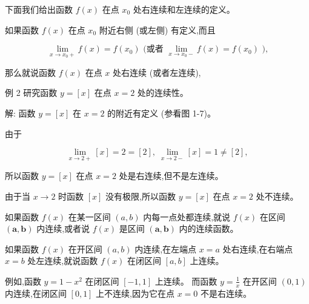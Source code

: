 \documentclass[lang=cn,newtx,12pt,scheme=chinese]{elegantbook}
\begin{document}
\begin{definition}[单侧连续性] 

下面我们给出函数 \(f\left( x\right)\) 在点 \({x}_{0}\) 处右连续和左连续的定义。

如果函数 \(f\left( x\right)\) 在点 \({x}_{0}\) 附近右侧 (或左侧) 有定义,而且

\[
\mathop{\lim }\limits_{{x \rightarrow {x}_{0} + }}f\left( x\right) = f\left( {x}_{0}\right) \text{ (或者 }\mathop{\lim }\limits_{{x \rightarrow {x}_{0} - }}f\left( x\right) = f\left( {x}_{0}\right) \text{ ),}
\]

那么就说函数 \(f\left( x\right)\) 在点 \(x\) 处右连续 (或者左连续),

\end{definition}

例 2 研究函数 \(y = \left\lbrack x\right\rbrack\) 在点 \(x = 2\) 处的连续性。

解: 函数 \(y = \left\lbrack x\right\rbrack\) 在 \(x = 2\) 的附近有定义 (参看图 1-7)。

由于

\[
\mathop{\lim }\limits_{{x \rightarrow 2 + }}\left\lbrack x\right\rbrack = 2 = \left\lbrack 2\right\rbrack ,\;\mathop{\lim }\limits_{{x \rightarrow 2 - }}\left\lbrack x\right\rbrack = 1 \neq \left\lbrack 2\right\rbrack ,
\]

所以函数 \(y = \left\lbrack x\right\rbrack\) 在点 \(x = 2\) 处是右连续,但不是左连续。

由于当 \(x \rightarrow 2\) 时函数 \(\left\lbrack x\right\rbrack\) 没有极限,所以函数 \(y = \left\lbrack x\right\rbrack\) 在点 \(x = 2\) 处不连续。

\begin{definition}[区间连续性] 

如果函数 \(f\left( x\right)\) 在某一区间 \(\left( {a,b}\right)\) 内每一点处都连续,就说 \(f\left( x\right)\) 在区间 \(\left( {\mathbf{a},\mathbf{b}}\right)\) 内连续,或者说 \(f\left( x\right)\) 是区间 \(\left( {\mathbf{a},\mathbf{b}}\right)\) 内的连续函数。

如果函数 \(f\left( x\right)\) 在开区间 \(\left( {a,b}\right)\) 内连续,在左端点 \(x = a\) 处右连续,在右端点 \(x = b\) 处左连续,就说函数 \(f\left( x\right)\) 在闭区间 \(\left\lbrack {a,b}\right\rbrack\) 上连续。

\end{definition}

例如,函数 \(y = 1 - {x}^{2}\) 在闭区间 \(\left\lbrack {-1,1}\right\rbrack\) 上连续。 而函数 \(y = \frac{1}{x}\) 在开区间 \(\left( {0,1}\right)\) 内连续,在闭区间 \(\left\lbrack {0,1}\right\rbrack\) 上不连续,因为它在点 \(x = 0\) 不是右连续。
\end{document}
